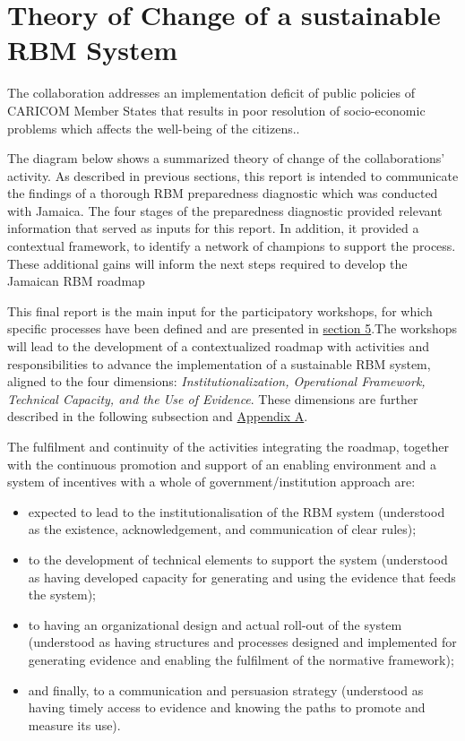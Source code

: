 \documentclass[
  10pt,
]{book}
\begin{document}
\hypertarget{theory-of-change-of-a-sustainable-rbm-system}{%
\section{Theory of Change of a sustainable RBM System}\label{theory-of-change-of-a-sustainable-rbm-system}}

The collaboration addresses an implementation deficit of public policies of CARICOM Member States that results in poor resolution of socio-economic problems which affects the well-being of the citizens..

The diagram below shows a summarized theory of change of the collaborations' activity. As described in previous sections, this report is intended to communicate the findings of a thorough RBM preparedness diagnostic which was conducted with Jamaica. The four stages of the preparedness diagnostic provided relevant information that served as inputs for this report. In addition, it provided a contextual framework, to identify a network of champions to support the process. These additional gains will inform the next steps required to develop the Jamaican RBM roadmap

This final report is the main input for the participatory workshops, for which specific processes have been defined and are presented in \protect\hyperlink{section5}{section 5}.The workshops will lead to the development of a contextualized roadmap with activities and responsibilities to advance the implementation of a sustainable RBM system, aligned to the four dimensions: \emph{Institutionalization, Operational Framework, Technical Capacity, and the Use of Evidence}. These dimensions are further described in the following subsection and \protect\hyperlink{appendixA}{Appendix A}.

The fulfilment and continuity of the activities integrating the roadmap, together with the continuous promotion and support of an enabling environment and a system of incentives with a whole of government/institution approach are:

\begin{itemize}
\item
  expected to lead to the institutionalisation of the RBM system (understood as the existence, acknowledgement, and communication of clear rules);
\item
  to the development of technical elements to support the system (understood as having developed capacity for generating and using the evidence that feeds the system);
\item
  to having an organizational design and actual roll-out of the system (understood as having structures and processes designed and implemented for generating evidence and enabling the fulfilment of the normative framework);
\item
  and finally, to a communication and persuasion strategy (understood as having timely access to evidence and knowing the paths to promote and measure its use).
\end{itemize}
\end{document}
